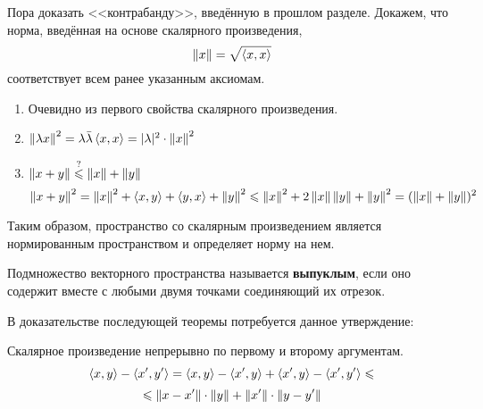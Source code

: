\documentclass[12pt]{article}
\begin{document}
    Пора доказать <<контрабанду>>, введённую в прошлом разделе. Докажем, что норма, введённая на основе скалярного произведения, 
    $$\left\| x \right\| = \sqrt{\left\langle x, x \right\rangle}$$
    соответствует всем ранее указанным аксиомам.

    \begin{enumerate}
    \item Очевидно из первого свойства скалярного произведения.
    \item $\left\| \lambda x \right\|^2 = \lambda \bar{\lambda} \left\langle x, x \right\rangle = | \lambda |^2 \cdot \left\| x \right\|^2$
    \item $\left\| x+y \right\| \overset{?}{\leqslant} \left\| x \right\| + \left\| y \right\|$
	      $$\left\| x + y \right\|^2 = \left\| x \right\|^2 + \left\langle x, y \right\rangle + \left\langle y, x \right\rangle + \left\| y \right\|^2 \leqslant \left\| x \right\|^2 + 2 \left\| x \right\| \left\| y \right\| + \left\| y \right\|^2
			= (\left\| x \right\| + \left\| y \right\|)^2
	      $$
    \end{enumerate}
	Таким образом, пространство со скалярным произведением является нормированным пространством и определяет норму на нем.
	
	\begin{defi}
		Подмножество векторного пространства называется \textbf{выпуклым}, если оно содержит вместе с любыми двумя 
		точками соединяющий их отрезок.
	\end{defi}

	В доказательстве последующей теоремы потребуется данное утверждение:
	\begin{state}
		Скалярное произведение непрерывно по первому и второму аргументам.
		$$\left\langle x, y \right\rangle - \left\langle x', y' \right\rangle = \left\langle x, y \right\rangle - \left\langle x', y \right\rangle + \left\langle x', y \right\rangle - \left\langle x', y' \right\rangle \leqslant$$
		$$\leqslant \left\| x - x' \right\|\cdot \left\| y \right\| + \left\| x' \right\| \cdot \left\| y - y' \right\|$$
	\end{state}
	
\end{document}

